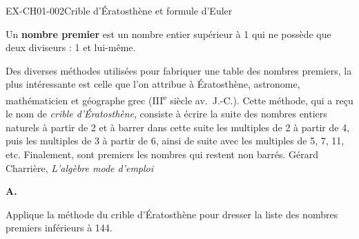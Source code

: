 
\begin{exercice}{EX-CH01-002}{Crible d'Ératosthène et formule d'Euler}

\begin{mdframed}[backgroundcolor=vlmgray, innerleftmargin=10pt, innerrightmargin=10pt, innertopmargin=6pt, innerbottommargin=6pt, skipabove=-5pt, skipbelow=5pt]
Un \textbf{nombre premier} est un nombre entier supérieur à 1 qui ne possède que deux diviseurs : 1 et lui-même.
\end{mdframed}


\medskip
{\footnotesize Des diverses méthodes utilisées pour fabriquer une table des nombres premiers, la plus intéressante est celle que l'on attribue à Ératosthène, astronome, mathématicien et géographe grec (III\textsuperscript{e} siècle av.\ J.-C.). Cette méthode, qui a reçu le nom de \textit{crible d'Ératosthène}, consiste à écrire la suite des nombres entiers naturels à partir de 2 et à barrer dans cette suite les multiples de 2 à partir de 4, puis les multiples de 3 à partir de 6, ainsi de suite avec les multiples de 5, 7, 11, etc. Finalement, sont premiers les nombres qui restent non barrés. \hfill Gérard Charrière, \textit{L'algèbre mode d'emploi}}

\vfill
\textbf{A.}

\medskip
Applique la méthode du crible d'Ératosthène pour dresser la liste des nombres premiers inférieurs à 144.


\end{exercice}
